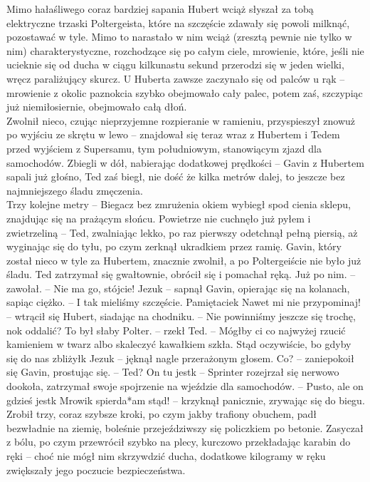 \documentclass[../MAIN.tex]{subfiles}
\begin{document}
Mimo hałaśliwego coraz bardziej sapania Hubert wciąż słyszał za tobą elektryczne trzaski Poltergeista, które na szczęście zdawały się powoli milknąć, pozostawać w tyle. Mimo to narastało w nim wciąż (zresztą pewnie nie tylko w nim) charakterystyczne, rozchodzące się po całym ciele, mrowienie, które, jeśli nie ucieknie się od ducha w ciągu kilkunastu sekund przerodzi się w jeden wielki, wręcz paraliżujący skurcz. U Huberta zawsze zaczynało się od palców u rąk -- mrowienie z okolic paznokcia szybko obejmowało cały palec, potem zaś, szczypiąc już niemiłosiernie, obejmowało całą dłoń.\\
Zwolnił nieco, czując nieprzyjemne rozpieranie w ramieniu, przyspieszył znowuż po wyjściu ze skrętu w lewo -- znajdował się teraz wraz z Hubertem i Tedem przed wyjściem z Supersamu, tym południowym, stanowiącym zjazd dla samochodów. Zbiegli w dół, nabierając dodatkowej prędkości -- Gavin z Hubertem sapali już głośno, Ted zaś biegł, nie dość że kilka metrów dalej, to jeszcze bez najmniejszego śladu zmęczenia.\\
Trzy kolejne metry -- Biegacz bez zmrużenia okiem wybiegł spod cienia sklepu, znajdując się na prażącym słońcu. Powietrze nie cuchnęło już pyłem i zwietrzeliną -- Ted, zwalniając lekko, po raz pierwszy odetchnął pełną piersią, aż wyginając się do tyłu, po czym zerknął ukradkiem przez ramię.
Gavin, który został nieco w tyle za Hubertem, znacznie zwolnił, a po Poltergeiście nie było już śladu. Ted zatrzymał się gwałtownie, obrócił się i pomachał ręką.
\sx Już po nim. -- zawołał. -- Nie ma go, stójcie!
\xx Jezu\3k -- sapnął Gavin, opierając się na kolanach, sapiąc ciężko. -- I tak mieliśmy szczęście. Pamiętacie\3k
\xx Nawet mi nie przypominaj! -- wtrącił się Hubert, siadając na chodniku. -- Nie powinniśmy jeszcze się trochę, no\3k oddalić?
\xx To był słaby Polter. -- rzekł Ted. -- Mógłby ci co najwyżej rzucić kamieniem w twarz albo skaleczyć kawałkiem szkła. Stąd oczywiście, bo gdyby się do nas zbliżył\3k Jezu\3k -- jęknął nagle przerażonym głosem.
\xx Co? -- zaniepokoił się Gavin, prostując się. -- Ted?
\xx On tu jest\3k -- Sprinter rozejrzał się nerwowo dookoła, zatrzymał swoje spojrzenie na wjeździe dla samochodów. -- Pusto, ale on gdzieś jest\3k Mrowi\3k spierda*am stąd! -- krzyknął panicznie, zrywając się do biegu.
\qd
Zrobił trzy, coraz szybsze kroki, po czym jakby trafiony obuchem, padł bezwładnie na ziemię, boleśnie przejeździwszy się policzkiem po betonie. Zasyczał z bólu, po czym przewrócił szybko na plecy, kurczowo przekładając karabin do ręki -- choć nie mógł nim skrzywdzić ducha, dodatkowe kilogramy w ręku zwiększały jego poczucie bezpieczeństwa.\\
\end{document}
